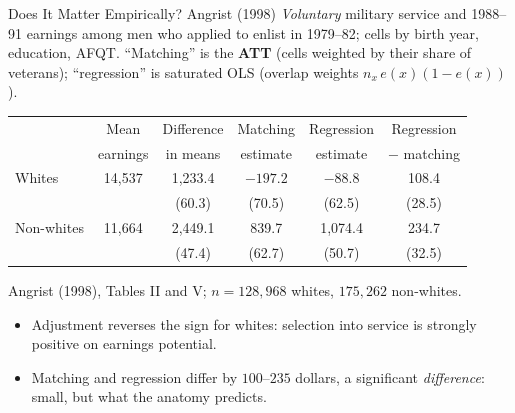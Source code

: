 \documentclass[aspectratio=169,11pt,xcolor=dvipsnames]{beamer}
\begin{document}
\begin{frame}[t]{Does It Matter Empirically? Angrist (1998)}
\emph{Voluntary} military service and 1988--91 earnings among men who applied
to enlist in 1979--82; cells by birth year, education, AFQT. ``Matching'' is
the \textbf{ATT} (cells weighted by their share of veterans); ``regression''
is saturated OLS (overlap weights $n_x\,e(x)(1-e(x))$).
\vskip-2pt
\begin{center}\footnotesize
\renewcommand{\arraystretch}{1.0}
\begin{tabular}{lccccc}
\toprule
 & Mean & Difference & Matching & Regression & Regression \\
 & earnings & in means & estimate & estimate & $-$ matching \\
\midrule
Whites & 14{,}537 & 1{,}233.4 & $-197.2$ & $-88.8$ & 108.4 \\
       &          & (60.3)    & (70.5)   & (62.5)  & (28.5) \\
Non-whites & 11{,}664 & 2{,}449.1 & 839.7 & 1{,}074.4 & 234.7 \\
       &          & (47.4)    & (62.7)   & (50.7)  & (32.5) \\
\bottomrule
\end{tabular}
\end{center}
\vskip-2pt
{\footnotesize Angrist (1998), Tables II and V; $n = 128{,}968$ whites,
$175{,}262$ non-whites.}
\begin{itemize}\itemsep1pt
  \item Adjustment reverses the sign for whites: selection into service is
        strongly positive on earnings potential.
  \item Matching and regression differ by $100$--$235$ dollars, a
        significant \emph{difference}: small, but what the anatomy predicts.
\end{itemize}
\end{frame}
\end{document}
